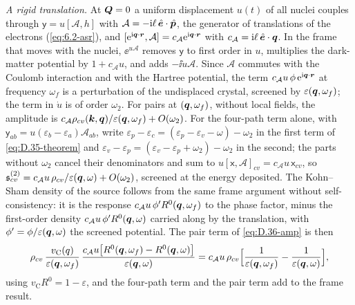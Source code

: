 \emph{A rigid translation.} At $\bm{Q} = 0$ a uniform displacement $u(t)$ of all nuclei couples through $\mathsf{y} = u[\mathcal{A}, h]$ with $\mathcal{A} = -\mathrm{i}\ell\,\hat{\bm{e}}\cdot\hat{\bm{p}}$, the generator of translations of the electrons (\cref{eq:6.2-asr}), and $[\mathrm{e}^{\mathrm{i}\bm{q}\cdot\bm{r}}, \mathcal{A}] = c_{\mathcal{A}}\mathrm{e}^{\mathrm{i}\bm{q}\cdot\bm{r}}$ with $c_{\mathcal{A}} = \mathrm{i}\ell\,\hat{\bm{e}}\cdot\bm{q}$. In the frame that moves with the nuclei, $\ee^{u\mathcal{A}}$ removes $\mathsf{y}$ to first order in $u$, multiplies the dark-matter potential by $1 + c_{\mathcal{A}}u$, and adds $-\ii\dot u\mathcal{A}$. Since $\mathcal{A}$ commutes with the Coulomb interaction and with the Hartree potential, the term $c_{\mathcal{A}}u\,\phi\,\mathrm{e}^{\mathrm{i}\bm{q}\cdot\bm{r}}$ at frequency $\omega_f$ is a perturbation of the undisplaced crystal, screened by $\varepsilon(\bm{q},\omega_f)$; the term in $\dot u$ is of order $\omega_2$. For pairs at $(\bm{q},\omega_f)$, without local fields, the amplitude is $c_{\mathcal{A}}\rho_{cv}(\bm{k},\bm{q})/\varepsilon(\bm{q},\omega_f) + O(\omega_2)$. For the four-path term alone, with $\mathsf{y}_{ab} = u(\varepsilon_b - \varepsilon_a)\mathcal{A}_{ab}$, write $\varepsilon_p - \varepsilon_c = (\varepsilon_p - \varepsilon_v - \omega) - \omega_2$ in the first term of \cref{eq:D.35-theorem} and $\varepsilon_v - \varepsilon_p = (\varepsilon_v - \varepsilon_p + \omega_2) - \omega_2$ in the second; the parts without $\omega_2$ cancel their denominators and sum to $u[\mathsf{x}, \mathcal{A}]_{cv} = c_{\mathcal{A}}u\,\mathsf{x}_{cv}$, so $\mathfrak{s}^{(2)}_{cv} = c_{\mathcal{A}}u\,\rho_{cv}/\varepsilon(\bm{q},\omega) + O(\omega_2)$, screened at the energy deposited. The Kohn--Sham density of the source follows from the same frame argument without self-consistency: it is the response $c_{\mathcal{A}}u\,\phi'R^0(\bm{q},\omega_f)$ to the phase factor, minus the first-order density $c_{\mathcal{A}}u\,\phi'R^0(\bm{q},\omega)$ carried along by the translation, with $\phi' = \phi/\varepsilon(\bm{q},\omega)$ the screened potential. The pair term of \cref{eq:D.36-amp} is then
\begin{equation*}
  \rho_{cv}\,\frac{v_{\mathrm{C}}(q)}{\varepsilon(\bm{q},\omega_f)}\,\frac{c_{\mathcal{A}}u\bigl[R^0(\bm{q},\omega_f) - R^0(\bm{q},\omega)\bigr]}{\varepsilon(\bm{q},\omega)}
  = c_{\mathcal{A}}u\,\rho_{cv}\Bigl[\frac{1}{\varepsilon(\bm{q},\omega_f)} - \frac{1}{\varepsilon(\bm{q},\omega)}\Bigr] ,
\end{equation*}
using $v_{\mathrm{C}}R^0 = 1 - \varepsilon$, and the four-path term and the pair term add to the frame result.

